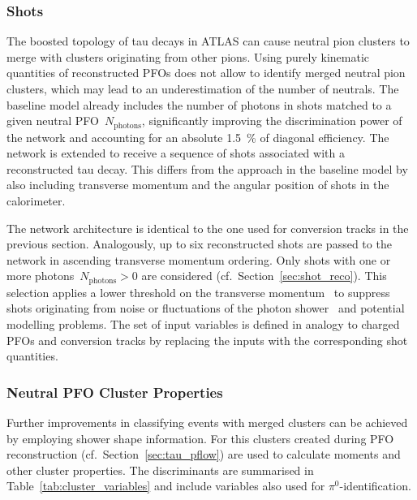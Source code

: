 \subsubsection{Shots}

The boosted topology of tau decays in ATLAS can cause neutral pion clusters to
merge with clusters originating from other pions. Using purely kinematic
quantities of reconstructed PFOs does not allow to identify merged neutral pion
clusters, which may lead to an underestimation of the number of neutrals. The
baseline model already includes the number of photons in shots matched to a
given neutral PFO~$N_\text{photons}$, significantly improving the discrimination
power of the network and accounting for an absolute \SI{1.5}{\percent} of
diagonal efficiency. The network is extended to receive a sequence of shots
associated with a reconstructed tau decay. This differs from the approach in the
baseline model by also including transverse momentum and the angular position of
shots in the calorimeter.

The network architecture is identical to the one used for conversion tracks in
the previous section. Analogously, up to six reconstructed shots are passed to
the network in ascending transverse momentum ordering. Only shots with one or
more photons~$N_\text{photons} > 0$ are considered (cf.\
Section~\ref{sec:shot_reco}). This selection applies a lower threshold on the
transverse momentum~\smash{$p_\text{T}^\text{shot}$} to suppress shots
originating from noise or fluctuations of the photon
shower~\cite{atlas:taurec:decaymodes} and potential modelling problems.
The set of input variables is defined in analogy to charged PFOs and conversion
tracks by replacing the inputs with the corresponding shot quantities.

\subsubsection{Neutral PFO Cluster Properties}

Further improvements in classifying events with merged clusters can be achieved
by employing shower shape information. For this clusters created during PFO
reconstruction (cf.\ Section~\ref{sec:tau_pflow}) are used to calculate moments
and other cluster properties.
The discriminants are summarised in Table~\ref{tab:cluster_variables} and
include variables also used for $\pi^0$-identification.

